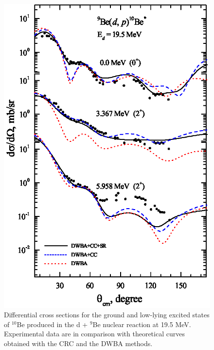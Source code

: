 \documentclass[10pt]{iopart}
\begin{document}
\begin{figure}[tp]
\includegraphics[scale=0.8]{1H10BE.eps}
\caption{\label{1H10BE} Differential cross sections for the ground and low-lying excited states of $^{10}$Be  produced in the d + $^9$Be nuclear reaction at 19.5 MeV. Experimental data are in comparison with  theoretical curves obtained with the CRC and the DWBA methods.  }
\end{figure}
\end{document}
